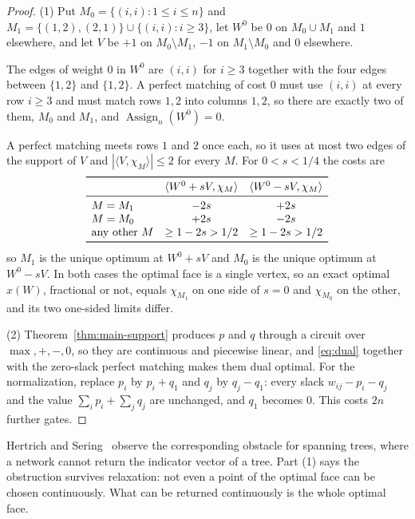 \documentclass[11pt]{article}
\newcommand{\Assign}{\operatorname{Assign}}
\begin{document}
\begin{proof}
(1)  Put $M_0=\{(i,i):1\le i\le n\}$ and
$M_1=\{(1,2),(2,1)\}\cup\{(i,i):i\ge3\}$, let $W^{0}$ be $0$ on
$M_0\cup M_1$ and $1$ elsewhere, and let $V$ be $+1$ on $M_0\setminus M_1$,
$-1$ on $M_1\setminus M_0$ and $0$ elsewhere.

The edges of weight $0$ in $W^{0}$ are $(i,i)$ for $i\ge3$ together with the
four edges between $\{1,2\}$ and $\{1,2\}$.  A perfect matching of cost $0$ must
use $(i,i)$ at every row $i\ge3$ and must match rows $1,2$ into columns $1,2$, so
there are exactly two of them, $M_0$ and $M_1$, and $\Assign_n(W^{0})=0$.

A perfect matching meets rows $1$ and $2$ once each, so it uses at most two
edges of the support of $V$ and $|\langle V,\chi_M\rangle|\le2$ for every $M$.
For $0<s<1/4$ the costs are
\[
  \begin{array}{lcc}
    \toprule
    & \langle W^{0}+sV,\chi_M\rangle & \langle W^{0}-sV,\chi_M\rangle\\
    \midrule
    M=M_1 & -2s & +2s\\
    M=M_0 & +2s & -2s\\
    \text{any other } M & \ge1-2s>1/2 & \ge1-2s>1/2\\
    \bottomrule
  \end{array}
\]
so $M_1$ is the unique optimum at $W^{0}+sV$ and $M_0$ is the unique optimum at
$W^{0}-sV$.  In both cases the optimal face is a single vertex, so an exact
optimal $x(W)$, fractional or not, equals $\chi_{M_1}$ on one side of $s=0$ and
$\chi_{M_0}$ on the other, and its two one-sided limits differ.

(2)  Theorem~\ref{thm:main-support} produces $p$ and $q$ through a circuit over
$\max,+,-,0$, so they are continuous and piecewise linear, and \eqref{eq:dual}
together with the zero-slack perfect matching makes them dual optimal.  For the
normalization, replace $p_i$ by $p_i+q_1$ and $q_j$ by $q_j-q_1$: every slack
$w_{ij}-p_i-q_j$ and the value $\sum_ip_i+\sum_jq_j$ are unchanged, and
$q_1$ becomes $0$.  This costs $2n$ further gates.
\end{proof}

Hertrich and Sering~\cite{hertrich-sering25} observe the corresponding obstacle
for spanning trees, where a network cannot return the indicator vector of a tree.
Part (1) says the obstruction survives relaxation: not even a point of the
optimal face can be chosen continuously.  What can be returned continuously is
the whole optimal face.
\end{document}
